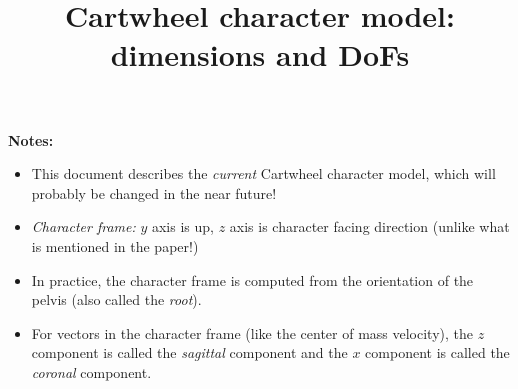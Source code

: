 \documentclass[a4paper]{article}
\title{Cartwheel character model: dimensions and DoFs}
\begin{document}
    
    
    
\pgfmathsetmacro{\lowerLegSizeY}{\legSizeY * \kneeRelativePosY}
\pgfmathsetmacro{\upperLegSizeY}{\legSizeY - \lowerLegSizeY}
    
\pgfmathsetmacro{\anklePosY}{\footSizeY}
\pgfmathsetmacro{\kneePosY}{\anklePosY + \legSizeY * \kneeRelativePosY}
\pgfmathsetmacro{\hipPosY}{\anklePosY + \legSizeY}
    

\maketitle
\textbf{Notes:}
\begin{itemize}
\item This document describes the \textit{current} Cartwheel character model, which will probably be changed in the near future!
\item \textit{Character frame:} $y$ axis is up, $z$ axis is character facing direction (unlike what is mentioned in the paper!)
\item In practice, the character frame is computed from the orientation of the pelvis (also called the \textit{root}).
\item For vectors in the character frame (like the center of mass velocity), the $z$ component is called the \textit{sagittal} component and the $x$ component is called the \textit{coronal} component.
\end{itemize}
\end{document}
